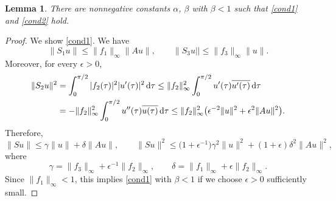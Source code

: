 \documentclass[10pt,a4paper]{amsart}
\newtheorem{Lemma}[thm]{Lemma}
\numberwithin{equation}{section}
\begin{document}
\begin{Lemma}
There are nonnegative constants $\alpha$, $\beta$ with $\beta<1$ such that
\eqref{cond1} and \eqref{cond2} hold.
\end{Lemma}
\begin{proof}
We show \eqref{cond1}.
We have
\begin{equation*}%
\|S_1u\|\le \|f_1\|_\infty\|Au\|,\qquad \|S_3u||\le \|f_3\|_\infty \|u\|.
\end{equation*}
Moreover, for every $\epsilon>0$,
\begin{align*}
\|S_2u\|^2&=\int_0^{\pi/2} |f_2(\tau)|^2 |u'(\tau)|^2\,{\rm d}\tau\le \|f_2\|_\infty^2\int_0^{\pi/2} u'(\tau)\overline{u'(\tau)}\,{\rm d}\tau\\
&= -\|f_2\|_\infty^2\int_0^{\pi/2} u''(\tau)\overline{u(\tau)}\,{\rm d}\tau \le \|f_2\|_\infty^2\bigl(\epsilon^{-2}\|u\|^2+\epsilon^2\|Au\|^2\bigr).
\end{align*}
Therefore,
\[
\|Su\|\le \gamma\|u\|+\delta\|Au\|,\qquad \|Su\|^2\le \bigl(1+\epsilon^{-1}\bigr)\gamma^2\|u\|^2+(1+\epsilon)\delta^2\|Au\|^2,
\]
where
\[
\gamma= \|f_3\|_\infty+\epsilon^{-1}\|f_2\|_\infty,\qquad
\delta= \|f_1\|_\infty+\epsilon\|f_2\|_\infty.
\]
Since $\|f_1\|_\infty<1$, this implies \eqref{cond1} with $\beta<1$ if we choose $\epsilon>0$ sufficiently small.


\end{proof}
\end{document}
